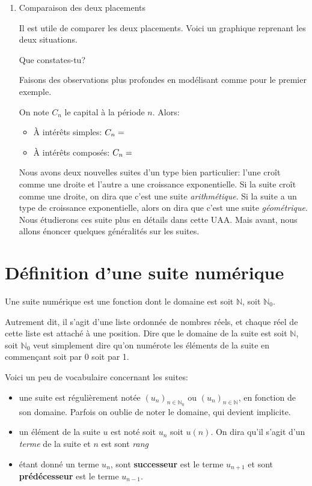\documentclass[a4paper,12pt]{report}
\newcommand{\IN}{\mathbb{N}}
\begin{document}
\begin{enumerate}
\item Comparaison des deux placements
\label{sec:org873e165}

Il est utile de comparer les deux placements. Voici un graphique reprenant les
deux situations.

\begin{center}

\end{center}

Que constates-tu? \dotfill

\dotfill

\dotfill


Faisons des observations plus profondes en modélisant comme pour le premier
exemple.

On note \(C_n\) le capital à la période \(n\). Alors:
\begin{itemize}
\item À intérêts simples: \(C_n=\dotfill\)
\item À intérêts composés: \(C_n=\dotfill\)
\end{itemize}

Nous avons deux nouvelles suites d'un type bien particulier: l'une croît comme
une droite et l'autre a une croissance exponentielle. Si la suite croît comme
une droite, on dira que c'est une suite \emph{arithmétique}. Si la suite a un type de
croissance exponentielle, alors on dira que c'est une suite \emph{géométrique}. Nous
étudierons ces suite plus en détails dans cette UAA. Mais avant, nous allons
énoncer quelques généralités sur les suites.
\end{enumerate}

\section{Définition d'une suite numérique}
\label{sec:org9dffeee}

\begin{definition}
Une suite numérique est une fonction dont le domaine est soit \(\IN\), soit
\(\IN_0\).
\end{definition}

 Autrement dit, il s'agit d'une liste ordonnée de nombres réels, et
chaque réel de cette liste est attaché à une position. Dire que le domaine de la suite
est soit \(\IN\), soit \(\IN_0\) veut simplement dire qu'on numérote les éléments de
la suite en commençant soit par 0 soit par 1.

Voici un peu de vocabulaire concernant les suites:
\begin{itemize}
\item une suite est régulièrement notée \((u_n)_{n\in\IN_0}\) ou  \((u_n)_{n\in\IN}\),
en fonction de son domaine. Parfois on oublie de noter le domaine, qui devient
implicite.
\item un élément de la suite \(u\) est noté soit \(u_n\) soit \(u(n)\). On dira
qu'il s'agit d'un \emph{terme} de la suite et \(n\) est sont \emph{rang}
\item étant donné un terme \(u_n\), sont \textbf{successeur} est le terme \(u_{n+1}\) et sont
\textbf{prédécesseur} est le terme \(u_{n-1}\).
\end{itemize}
\end{document}
